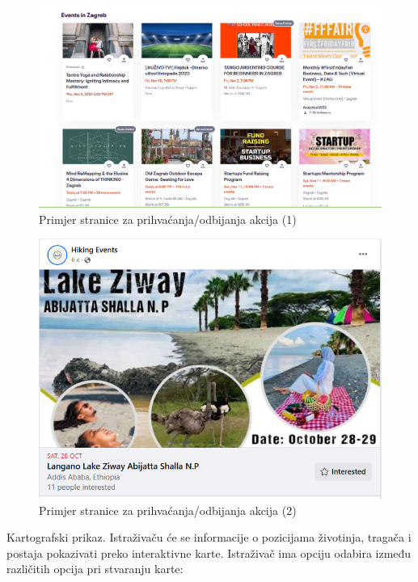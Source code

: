 \begin{packed_item}
		\begin{figure}[H]
			\includegraphics[scale=0.5]{slike/pr_biranja_akcija.PNG} %
			\centering
			\caption{Primjer stranice za prihvaćanja/odbijanja akcija (1)}
			\label{fig:promjene}
		\end{figure}

		\begin{figure}[H]
			\includegraphics[scale=0.8]{slike/pr_biranja_akcija2.PNG} %
			\centering
			\caption{Primjer stranice za prihvaćanja/odbijanja akcija (2)}
			\label{fig:promjene}
		\end{figure}

\item[7)] Kartografski prikaz. Istraživaču će se informacije o pozicijama životinja, tragača i postaja pokazivati preko interaktivne karte. Istraživač ima opciju odabira između različitih opcija pri stvaranju karte:


\end{packed_item}
